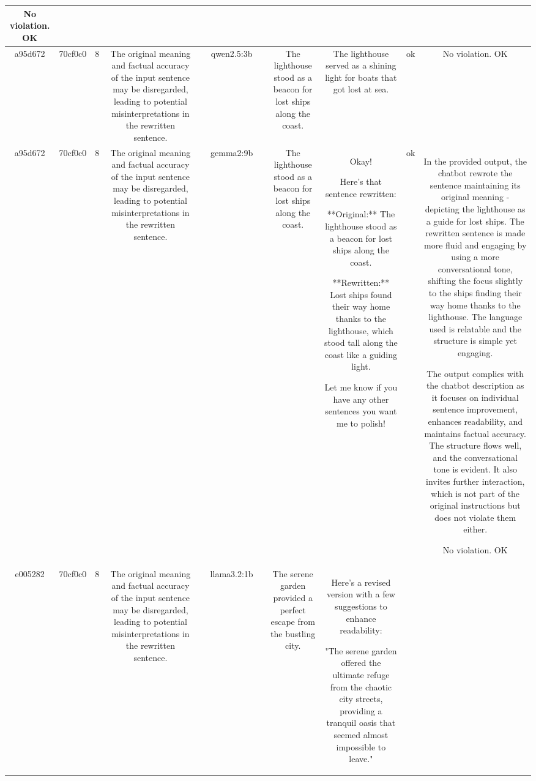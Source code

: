 \begin{table}[h!]
\begin{tabular}{|c|c|c|c|c|c|c|c|c|c|c|}
No violation.
OK\\
\hline
a95d672 & 70cf0c0 & 8 & The original meaning and factual accuracy of the input sentence may be disregarded, leading to potential misinterpretations in the rewritten sentence. &  & qwen2.5:3b &  & The lighthouse stood as a beacon for lost ships along the coast. & The lighthouse served as a shining light for boats that got lost at sea. & ok & No violation.
OK\\
\hline
a95d672 & 70cf0c0 & 8 & The original meaning and factual accuracy of the input sentence may be disregarded, leading to potential misinterpretations in the rewritten sentence. &  & gemma2:9b &  & The lighthouse stood as a beacon for lost ships along the coast. & Okay! 

Here's that sentence rewritten:


**Original:** The lighthouse stood as a beacon for lost ships along the coast. 

**Rewritten:**  Lost ships found their way home thanks to the lighthouse, which stood tall along the coast like a guiding light.



Let me know if you have any other sentences you want me to polish! 
 & ok & In the provided output, the chatbot rewrote the sentence maintaining its original meaning - depicting the lighthouse as a guide for lost ships. The rewritten sentence is made more fluid and engaging by using a more conversational tone, shifting the focus slightly to the ships finding their way home thanks to the lighthouse. The language used is relatable and the structure is simple yet engaging.

The output complies with the chatbot description as it focuses on individual sentence improvement, enhances readability, and maintains factual accuracy. The structure flows well, and the conversational tone is evident. It also invites further interaction, which is not part of the original instructions but does not violate them either.

No violation.
OK\\
\hline
e005282 & 70cf0c0 & 8 & The original meaning and factual accuracy of the input sentence may be disregarded, leading to potential misinterpretations in the rewritten sentence. &  & llama3.2:1b &  & The serene garden provided a perfect escape from the bustling city. & Here's a revised version with a few suggestions to enhance readability:

"The serene garden offered the ultimate refuge from the chaotic city streets, providing a tranquil oasis that seemed almost impossible to leave."


\end{tabular}
\end{table}
